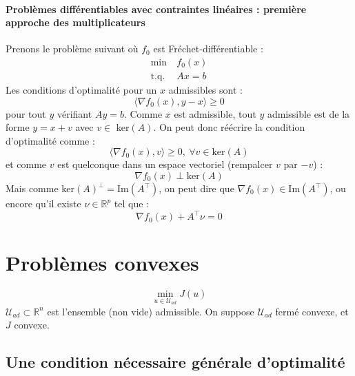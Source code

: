 \paragraph{Problèmes différentiables avec contraintes linéaires : première approche des multiplicateurs}
Prenons le problème suivant où $f_0$ est Fréchet-différentiable :
\[\begin{aligned}
	\min\ & f_0(x)\\
	\text{t.q. } & Ax=b
\end{aligned}\]
Les conditions d'optimalité pour un $x$ admissibles sont :
	\[\langle \nabla f_0(x),y-x\rangle\geq 0\]
pour tout $y$ vérifiant $Ay=b$. Comme $x$ est admissible, tout $y$ admissible est de la forme $y=x+v$ avec $v\in$ ker$(A)$. On peut donc réécrire la condition d'optimalité comme :
	\[\langle \nabla f_0(x),v\rangle\geq 0,\ \forall v\in\text{ker}(A)\]
et comme $v$ est quelconque dans un espace vectoriel (rempalcer $v$ par $-v$) : 
	\[\nabla f_0(x)\perp\text{ker}(A)\]
Mais comme ker$(A)^\perp=$Im$(A^\intercal)$, on peut dire que $\nabla f_0(x)\in$Im$(A^\intercal)$, ou encore qu'il existe $\nu\in\mathbb{R}^p$ tel que :
	\[\nabla f_0(x)+A^\intercal \nu=0\]

\section{Problèmes convexes}
\[\min_{u\in\mathcal{U}_{ad}} J(u)\]
$\mathcal{U}_{ad}\subset\mathbb{R}^n$ est l'ensemble (non vide) admissible.
On suppose $\mathcal{U}_{ad}$ fermé convexe, et $J$ convexe.


\subsection{Une condition nécessaire générale d'optimalité}



